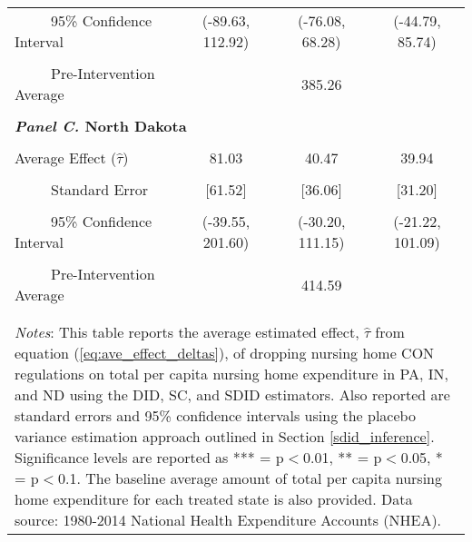 \documentclass[../Main.tex]{subfiles}
\begin{document}
\begin{table}[htbp]
\begin{tabular}{l*{3}{c}}
\\[-2ex]
\multicolumn{1}{l}{\ \ \ \ \ 95\% Confidence Interval}&   \multicolumn{1}{c}{(-89.63, 112.92)}&   \multicolumn{1}{c}{(-76.08, 68.28)}&   \multicolumn{1}{c}{(-44.79, 85.74)}\\
\\[-2ex]
\multicolumn{1}{l}{\ \ \ \ \ Pre-Intervention Average}&   \multicolumn{3}{c}{385.26}\\
\\[-.1ex]
\multicolumn{4}{l}{\textbf{\textit{Panel C.} North Dakota}}\\
\\[-1.5ex]
\multicolumn{1}{l}{Average Effect ($\hat{\tau}$)}&   \multicolumn{1}{c}{81.03}&   \multicolumn{1}{c}{40.47}&  \multicolumn{1}{c}{39.94}\\
\\[-2ex]
\multicolumn{1}{l}{\ \ \ \ \ Standard Error}  &\multicolumn{1}{c}{[61.52]}&\multicolumn{1}{c}{[36.06]}&\multicolumn{1}{c}{[31.20]}\\
\\[-2ex]
\multicolumn{1}{l}{\ \ \ \ \ 95\% Confidence Interval}&   \multicolumn{1}{c}{(-39.55, 201.60)}&   \multicolumn{1}{c}{(-30.20, 111.15)}&   \multicolumn{1}{c}{(-21.22, 101.09)}\\
\\[-2ex]
\multicolumn{1}{l}{\ \ \ \ \ Pre-Intervention Average}&   \multicolumn{3}{c}{414.59}\\
\\[-.1ex]
\hline\hline
\\[-2ex]
\multicolumn{4}{p{.78\linewidth}}{\footnotesize \textit{Notes}: This table reports the average estimated effect, $\hat{\tau}$ from equation (\ref{eq:ave_effect_deltas}), of dropping nursing home CON regulations on total per capita nursing home expenditure in PA, IN, and ND using the DID, SC, and SDID estimators. Also reported are standard errors and 95\% confidence intervals using the placebo variance estimation approach outlined in Section \ref{sdid_inference}. Significance levels are reported as *** = p$<$0.01, ** = p$<$0.05, * = p$<$0.1. The baseline average amount of total per capita nursing home expenditure for each treated state is also provided. Data source: 1980-2014 National Health Expenditure Accounts (NHEA).}
\end{tabular}
\end{table}
\vfill
\clearpage
\end{document}
